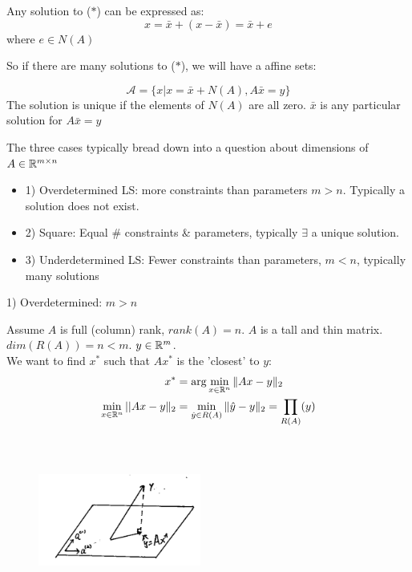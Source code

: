 Any solution to ($*$) can be expressed as:
\begin{equation*}
x = \bar{x} + (x - \bar{x}) = \bar{x} + e
\end{equation*}
where $e\in N(A)$

So if there are many solutions to ($*$), we will have a affine sets:

\begin{equation*}
\mathcal{A} = \{x|x = \bar{x} + N(A), A\bar{x} = y \}
\end{equation*}
The solution is unique if the elements of $N(A)$ are all zero. $\bar{x}$ is any particular solution for $A\bar{x} =y$

\vspace{0.5cm}
The three cases typically bread down into a question about dimensions of $A\in \mathbb{R}^{m\times n}$
\begin{itemize}
	\item 1) Overdetermined LS: more constraints than parameters $m>n$. Typically a solution does not exist. 
	
	\item 2) Square: Equal \# constraints \& parameters, typically $\exists$ a unique solution.
	
	\item 3) Underdetermined LS: Fewer constraints than parameters, $m<n$, typically many solutions
\end{itemize}

1) Overdetermined: $m > n$

Assume $A$ is full (column) rank, $rank(A) =n$. $A$ is a tall and thin matrix. $dim(R(A)) = n < m$. $y\in \mathbb{R}^m$.\\

We want to find $x^*$ such that $Ax^*$ is the 'closest' to $y$:
\begin{align*}
x^* &= \arg \min_{x\in \mathbb{R}^n}\Vert Ax - y\Vert_2\\
\min_{x\in \mathbb{R}^{n}}||Ax - y\Vert_2 &= \min_{\hat{y}\in R(A)}\Vert \hat{y} - y\Vert_2 =\prod_{R(A)}(y)\\
\end{align*}

\begin{figure}
	\centering
	\includegraphics[width=2.1in,height=2.1in]{figures/ch06/figure1.png}
\end{figure}

